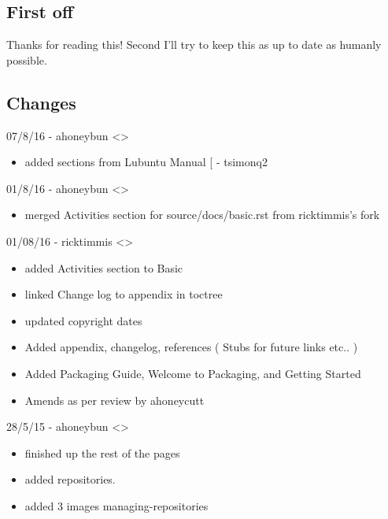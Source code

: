 \documentclass[letterpaper,10pt,english]{sphinxmanual}
\begin{document}
\subsection{First off}
\label{\detokenize{docs/appendix/changes:first-off}}
Thanks for reading this! Second I'll try to keep this as up to date as humanly possible.


\subsection{Changes}
\label{\detokenize{docs/appendix/changes:changes}}
07/8/16 - ahoneybun \textless{}\textgreater{}
\begin{itemize}
\item {} 
added sections from Lubuntu Manual {[}\sphinxurl{https://github.com/tsimonq2/lubuntu-manual}{]}
- tsimonq2

\end{itemize}

01/8/16 - ahoneybun \textless{}\textgreater{}
\begin{itemize}
\item {} 
merged Activities section for source/docs/basic.rst from ricktimmis's fork

\end{itemize}

01/08/16 - ricktimmis \textless{}\textgreater{}
\begin{itemize}
\item {} 
added Activities section to Basic

\item {} 
linked Change log to appendix in toctree

\item {} 
updated copyright dates

\item {} 
Added appendix, changelog, references ( Stubs for future links etc.. )

\item {} 
Added Packaging Guide, Welcome to Packaging, and Getting Started

\item {} 
Amends as per review by ahoneycutt

\end{itemize}

28/5/15 - ahoneybun \textless{}\textgreater{}
\begin{itemize}
\item {} 
finished up the rest of the pages

\item {} 
added repositories.

\item {} 
added 3 images managing-repositories

\end{itemize}
\end{document}
